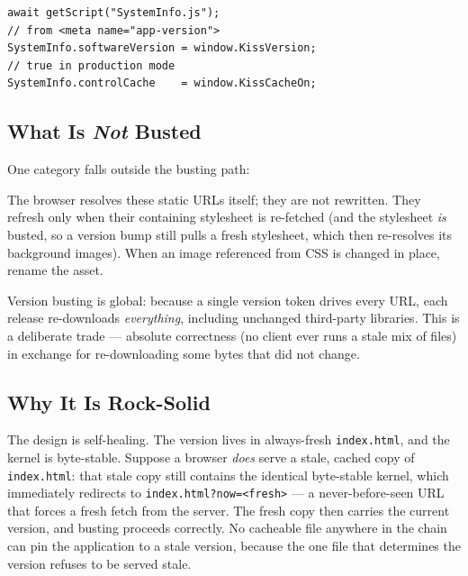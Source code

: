 \begin{lstlisting}[style=javascript]
await getScript("SystemInfo.js");
// from <meta name="app-version">
SystemInfo.softwareVersion = window.KissVersion;
// true in production mode
SystemInfo.controlCache    = window.KissCacheOn;
\end{lstlisting}

\subsection{What Is \emph{Not} Busted}
\label{sec:cache-not-covered}

One category falls outside the busting path:

\begin{description}[style=nextline]
  \item[\texttt{background-image:url()} inside CSS] The browser resolves these static URLs itself; they are not rewritten.  They refresh only when their containing stylesheet is re-fetched (and the stylesheet \emph{is} busted, so a version bump still pulls a fresh stylesheet, which then re-resolves its background images).  When an image referenced from CSS is changed in place, rename the asset.
\end{description}

\begin{tipbox}
Version busting is global: because a single version token drives every URL, each release re-downloads \emph{everything}, including unchanged third-party libraries.  This is a deliberate trade --- absolute correctness (no client ever runs a stale mix of files) in exchange for re-downloading some bytes that did not change.
\end{tipbox}

\subsection{Why It Is Rock-Solid}
\label{sec:cache-robust}

The design is self-healing.  The version lives in always-fresh \texttt{index.html}, and the kernel is byte-stable.  Suppose a browser \emph{does} serve a stale, cached copy of \texttt{index.html}: that stale copy still contains the identical byte-stable kernel, which immediately redirects to \texttt{index.html?now=<fresh>} --- a never-before-seen URL that forces a fresh fetch from the server.  The fresh copy then carries the current version, and busting proceeds correctly.  No cacheable file anywhere in the chain can pin the application to a stale version, because the one file that determines the version refuses to be served stale.

